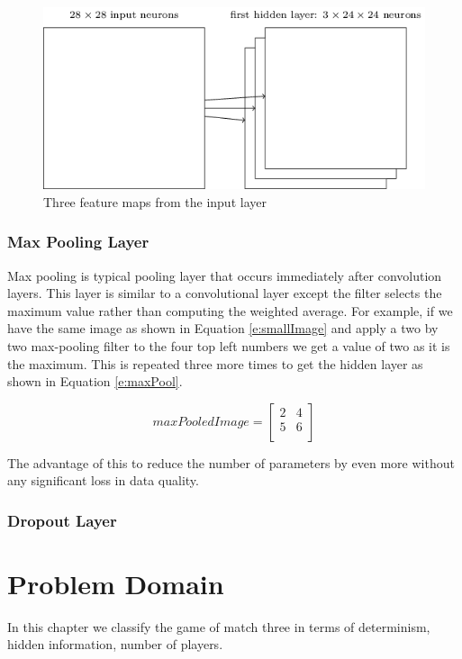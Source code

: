 \documentclass{bhamthesis}
\theoremstyle{definition}
\begin{document}
\begin{figure}
	\includegraphics[width=\textwidth]{media/img/cnn3FeatureMaps}
	\caption{Three feature maps from the input layer \cite{Neilsen2015}}\label{f:CNN3Feature}
\end{figure}


\subsection{Max Pooling Layer}
Max pooling is typical pooling layer that occurs immediately after convolution layers. This layer is similar to a convolutional layer except the filter selects the maximum value rather than computing the weighted average. For example, if we have the same image as shown in Equation \ref{e:smallImage} and apply a two by two max-pooling filter to the four top left numbers we get a value of two as it is the maximum. This is repeated three more times to get the hidden layer as shown in Equation \ref{e:maxPool}.

\begin{equation}\label{e:maxPool}
maxPooledImage=
\left[\begin{array}{cc}
2 & 4 \\
5 & 6 \\
\end{array}\right]
\end{equation}

The advantage of this to reduce the number of parameters by even more without any significant loss in data quality.
\subsection{Dropout Layer}




\chapter{Problem Domain}\label{ch:pb}
In this chapter we classify the game of match three in terms of determinism, hidden information, number of players.
\end{document}
